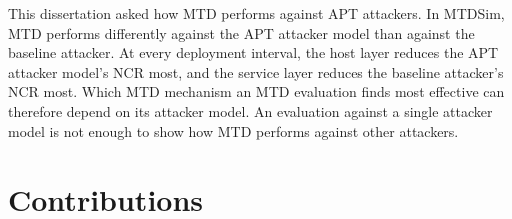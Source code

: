 \documentclass{cshonours}
\begin{document}
This dissertation asked how MTD performs against APT attackers. In MTDSim, MTD
performs differently against the APT attacker model than against the baseline
attacker. At every deployment interval, the host layer reduces the APT attacker
model's NCR most, and the service layer reduces the baseline attacker's NCR
most. Which MTD mechanism an MTD evaluation finds most effective can therefore
depend on its attacker model. An evaluation against a single attacker model
is not enough to show how MTD performs against other attackers.

\section{Contributions}
\label{sec:contributions}
\end{document}
